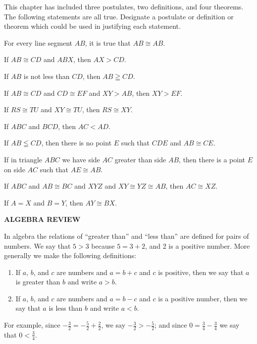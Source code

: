 \documentclass[11pt]{book}
\newcommand{\IVhead}[1]{%
  \par\bigskip\begin{center}\bfseries\large\MakeUppercase{#1}\end{center}%
  \par\nopagebreak\medskip}
\begin{document}
\begin{exercisecols}
\medskip
This chapter has included three postulates, two definitions, and four theorems.
The following statements are all true. Designate a postulate or definition or
theorem which could be used in justifying each statement.

\begin{exlist}[start=11]
\item For every line segment $AB$, it is true that $AB \cong AB$.
\item If $AB \cong CD$ and $ABX$, then $AX > CD$.
\item If $AB$ is not less than $CD$, then $AB \geqq CD$.
\item If $AB \cong CD$ and $CD \cong EF$ and $XY > AB$, then $XY > EF$.
\item If $RS \cong TU$ and $XY \cong TU$, then $RS \cong XY$.
\item If $ABC$ and $BCD$, then $AC < AD$.
\item If $AB \leqq CD$, then there is no point $E$ such that $CDE$ and
      $AB \cong CE$.
\item If in triangle $ABC$ we have side $AC$ greater than side $AB$, then there
      is a point $E$ on side $AC$ such that $AE \cong AB$.
\item If $ABC$ and $AB \cong BC$ and $XYZ$ and $XY \cong YZ \cong AB$, then
      $AC \cong XZ$.
\item If $A = X$ and $B = Y$, then $AY \cong BX$.
\end{exlist}

\IVhead{Algebra Review}

In algebra the relations of ``greater than'' and ``less than'' are defined for
pairs of numbers. We say that $5 > 3$ because $5 = 3 + 2$, and 2 is a positive
number. More generally we make the following definitions:

\begin{enumerate}[label=(\arabic*), leftmargin=2.2em, itemsep=2pt, topsep=3pt]
\item If $a$, $b$, and $c$ are numbers and $a = b + c$ and $c$ is positive, then
      we say that $a$ is greater than $b$ and write $a > b$.
\item If $a$, $b$, and $c$ are numbers and $a = b - c$ and $c$ is a positive
      number, then we say that $a$ is less than $b$ and write $a < b$.
\end{enumerate}

For example, since $-\frac{3}{2} = -\frac{5}{2} + \frac{2}{2}$, we say
$-\frac{3}{2} > -\frac{5}{2}$; and since $0 = \frac{3}{4} - \frac{3}{4}$ we say
that $0 < \frac{3}{4}$.


\end{exercisecols}
\end{document}
